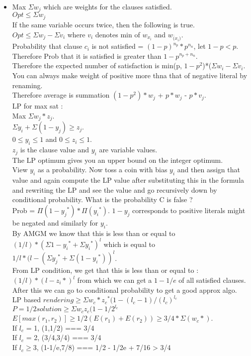 \documentclass[solution,addpoints,12pt]{exam}
\begin{document}
\begin{itemize}
\item
Max $\Sigma w_j$ which are weights for the clauses satisfied.\\
$Opt \le \Sigma w_j$\\
If the same variable occurs twice, then the following is true.\\
$Opt \le \Sigma w_j - \Sigma v_i$ where $v_i$ denotes min of $w_{x_i}$
and $w_{\overline(x_i)}$.\\
Probability that clause $c_i$ is not satisfied  = $(1-p)^{n_p}*p^{n_n}$,
let $1-p < p$. Therefore Prob that it is satisfied is greater than $1-p^{n_p+n_n}$.\\
Therefore the expected number of satisfaction is min(p, $1-p^2$)*($\Sigma w_i - \Sigma v_i$.\\
You can always make weight of positive more thna that of negative literal by renaming.\\
Therefore average is summation $(1-p^2)*w_j$ + $p*w_j$ - $p*v_j$.\\
LP for max sat :\\
Max $\Sigma w_j*z_j$.\\
$\Sigma y_i + \Sigma(1 - y_j) \ge z_j$.\\
$ 0 \le y_i \le 1$ and $ 0 \le z_i \le 1$.\\
$z_j$ is the clause value and $y_i$ are variable values.\\
The LP optimum gives you an upper bound on the integer optimum.\\
View $y_i$ as a probability. Now toss a coin with bias $y_i$
and then assign that value and again compute the LP value after
substituting this in the formula and rewriting the LP and see the value
and go recursively down by conditional probability.
What is the probability C is false ?\\
Prob = $\Pi(1 - {y_j}^*)*\Pi({y_i}^*)$. $1 - y_j$ corresponds to
positive literals might be negated and similarly for $y_i$.\\

By AMGM we know that this is less than or equal to ${(1/l)*(\Sigma 1 - {y_i}^* + \Sigma {y_i}^*)}^l$ which is equal to ${1/l*(l - (\Sigma {y_j}^*  + \Sigma (1 - {y_i}^*))}^l$.\\
From LP condition, we get that this is less than or equal to :\\
${(1/l)*(l - z_i*)}^l$ from which we can get a $1 - 1/e$ of all satisfied clauses.
After this we can go to conditional probability to get a good approx algo.\\

LP based $rendering  \ge \Sigma w_c*{z_c}^*(1-{(l_c-1)/(l_c)}^{l_c}$\\
$P = 1/2 solution \ge \Sigma w_c z_c (1 - 1/2^{l_c}$
$E[max(r_1, r_2)] \ge 1/2(E(r_1) + E(r_2)) \ge 3/4*\Sigma(w_c*)$.\\
If $l_c$ = 1, (1,1/2) === 3/4\\
If $l_c$ = 2, (3/4,3/4) === 3/4\\
If $l_c \geq 3$, (1-1/e,7/8) === 1/2 - 1/2e + 7/16 > 3/4\\
\end{itemize}
\end{document}
